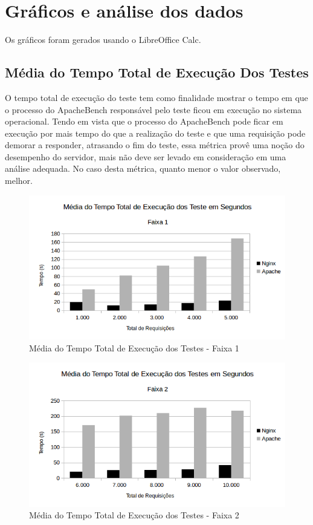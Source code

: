 \section{Gráficos e análise dos dados}

Os gráficos foram gerados usando o LibreOffice Calc.

\subsection{Média do Tempo Total de Execução Dos Testes}

O tempo total de execução do teste tem como finalidade mostrar o tempo em que o 
processo do ApacheBench responsável pelo teste ficou em execução no sistema 
operacional. Tendo em vista que o processo do ApacheBench pode ficar em 
execução 
por mais tempo do que a realização do teste e que uma requisição pode demorar a 
responder, atrasando o fim do teste, essa métrica provê uma noção do desempenho 
do servidor, mais não deve ser levado em consideração em uma análise adequada. 
No caso desta métrica, quanto menor o valor observado, melhor.

\begin{figure}[H]
	\centering
	\includegraphics[width=1\linewidth]{graficos/grafico1-f1} 
	\caption{Média do Tempo Total de Execução dos Testes - Faixa 1}
	\label{fig:grafico1-f1}
\end{figure}

\begin{figure}[H]
	\centering
	\includegraphics[width=1\linewidth]{graficos/grafico1-f2} 
	\caption{Média do Tempo Total de Execução dos Testes - Faixa 2}
	\label{fig:grafico1-f2}
\end{figure}

